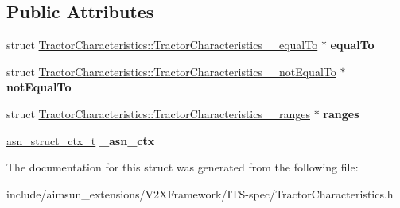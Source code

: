 \subsection*{Public Attributes}
\begin{DoxyCompactItemize}
\item 
struct \hyperlink{structTractorCharacteristics_1_1TractorCharacteristics____equalTo}{Tractor\+Characteristics\+::\+Tractor\+Characteristics\+\_\+\+\_\+equal\+To} $\ast$ {\bfseries equal\+To}\hypertarget{structTractorCharacteristics_ab2e034f97bbb318dc194e78fe63c8781}{}\label{structTractorCharacteristics_ab2e034f97bbb318dc194e78fe63c8781}

\item 
struct \hyperlink{structTractorCharacteristics_1_1TractorCharacteristics____notEqualTo}{Tractor\+Characteristics\+::\+Tractor\+Characteristics\+\_\+\+\_\+not\+Equal\+To} $\ast$ {\bfseries not\+Equal\+To}\hypertarget{structTractorCharacteristics_a735f06d50daa1fae4a50afda4b0a427d}{}\label{structTractorCharacteristics_a735f06d50daa1fae4a50afda4b0a427d}

\item 
struct \hyperlink{structTractorCharacteristics_1_1TractorCharacteristics____ranges}{Tractor\+Characteristics\+::\+Tractor\+Characteristics\+\_\+\+\_\+ranges} $\ast$ {\bfseries ranges}\hypertarget{structTractorCharacteristics_a4473fb06aa517ff2146c7f46ef2c19c7}{}\label{structTractorCharacteristics_a4473fb06aa517ff2146c7f46ef2c19c7}

\item 
\hyperlink{structasn__struct__ctx__s}{asn\+\_\+struct\+\_\+ctx\+\_\+t} {\bfseries \+\_\+asn\+\_\+ctx}\hypertarget{structTractorCharacteristics_a59d5cfff5b1277fcc008ab97222f3d5a}{}\label{structTractorCharacteristics_a59d5cfff5b1277fcc008ab97222f3d5a}

\end{DoxyCompactItemize}


The documentation for this struct was generated from the following file\+:\begin{DoxyCompactItemize}
\item 
include/aimsun\+\_\+extensions/\+V2\+X\+Framework/\+I\+T\+S-\/spec/Tractor\+Characteristics.\+h\end{DoxyCompactItemize}
